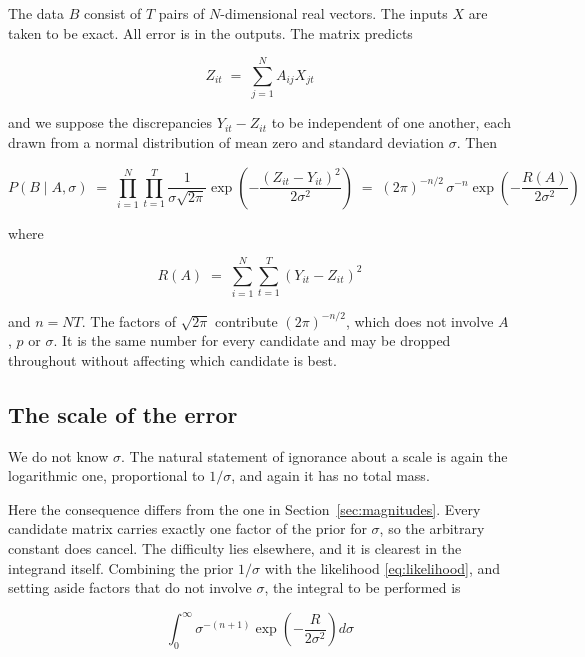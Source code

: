 The data $B$ consist of $T$ pairs of $N$-dimensional real vectors. The inputs $X$ are
taken to be exact. All error is in the outputs. The matrix predicts

\begin{equation}
Z_{it} \;=\; \sum_{j=1}^{N} A_{ij} X_{jt}
\label{eq:Z}
\end{equation}

and we suppose the discrepancies $Y_{it} - Z_{it}$ to be independent of one another,
each drawn from a normal distribution of mean zero and standard deviation $\sigma$.
Then

\begin{equation}
P(B \mid A, \sigma) \;=\; \prod_{i=1}^{N} \prod_{t=1}^{T}
\frac{1}{\sigma \sqrt{2\pi}}
\exp\!\left( -\frac{(Z_{it} - Y_{it})^{2}}{2\sigma^{2}} \right)
\;=\; (2\pi)^{-n/2} \, \sigma^{-n} \exp\!\left( -\frac{R(A)}{2\sigma^{2}} \right)
\label{eq:likelihood}
\end{equation}

where

\begin{equation}
R(A) \;=\; \sum_{i=1}^{N} \sum_{t=1}^{T} \left( Y_{it} - Z_{it} \right)^{2}
\label{eq:R}
\end{equation}

and $n = NT$. The factors of $\sqrt{2\pi}$ contribute $(2\pi)^{-n/2}$, which does not
involve $A$, $p$ or $\sigma$. It is the same number for every candidate and may be
dropped throughout without affecting which candidate is best.

\subsection{The scale of the error}

We do not know $\sigma$. The natural statement of ignorance about a scale is again
the logarithmic one, proportional to $1/\sigma$, and again it has no total mass.

Here the consequence differs from the one in Section~\ref{sec:magnitudes}. Every
candidate matrix carries exactly one factor of the prior for $\sigma$, so the
arbitrary constant does cancel. The difficulty lies elsewhere, and it is clearest in
the integrand itself. Combining the prior $1/\sigma$ with the likelihood
\eqref{eq:likelihood}, and setting aside factors that do not involve $\sigma$, the
integral to be performed is

\begin{equation}
\int_{0}^{\infty} \sigma^{-(n+1)}
\exp\!\left( -\frac{R}{2\sigma^{2}} \right) d\sigma
\label{eq:sigmanaive}
\end{equation}

